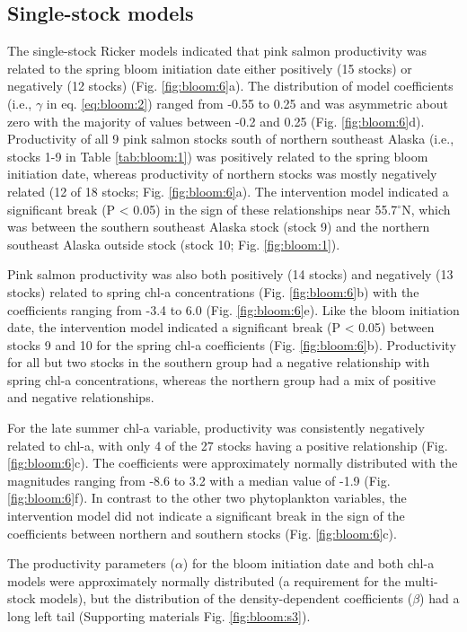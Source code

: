 \subsection{Single-stock models}

The single-stock Ricker models indicated that pink salmon productivity was
related to the spring bloom initiation date either positively (15 stocks) or
negatively (12 stocks) (Fig. \ref{fig:bloom:6}a). The distribution of model coefficients (i.e.,
\(\gamma\) in eq. \ref{eq:bloom:2}) ranged from -0.55 to 0.25 and was asymmetric
about zero with the majority of values between -0.2 and 0.25 (Fig.
\ref{fig:bloom:6}d).
Productivity of all 9 pink salmon stocks south of northern southeast Alaska
(i.e., stocks 1-9 in Table \ref{tab:bloom:1}) was positively related to the spring bloom
initiation date, whereas productivity of northern stocks was mostly negatively
related (12 of 18 stocks; Fig.  \ref{fig:bloom:6}a). The intervention model indicated a
significant break (P \textless{} 0.05) in the sign of these relationships near
55.7$^{\circ}$N, which was between the southern southeast Alaska stock (stock 9)
and the northern southeast Alaska outside stock (stock 10; Fig.
\ref{fig:bloom:1}).

Pink salmon productivity was also both positively (14 stocks) and negatively (13
stocks) related to spring chl-a concentrations (Fig. \ref{fig:bloom:6}b) with the coefficients
ranging from -3.4 to 6.0 (Fig. \ref{fig:bloom:6}e). Like the bloom initiation date, the
intervention model indicated a significant break (P \textless{} 0.05) between
stocks 9 and 10 for the spring chl-a coefficients (Fig. \ref{fig:bloom:6}b). Productivity for
all but two stocks in the southern group had a negative relationship with spring
chl-a concentrations, whereas the northern group had a mix of positive and
negative relationships.

For the late summer chl-a variable, productivity was consistently negatively
related to chl-a, with only 4 of the 27 stocks having a positive relationship
(Fig. \ref{fig:bloom:6}c). The coefficients were approximately normally distributed with the
magnitudes ranging from -8.6 to 3.2 with a median value of -1.9 (Fig.
\ref{fig:bloom:6}f). In
contrast to the other two phytoplankton variables, the intervention model did
not indicate a significant break in the sign of the coefficients between
northern and southern stocks (Fig. \ref{fig:bloom:6}c).

The productivity parameters (\(\alpha\)) for the bloom initiation date and both
chl-a models were approximately normally distributed (a requirement for the
multi-stock models), but the distribution of the density-dependent coefficients
(\(\beta\)) had a long left tail (Supporting materials Fig. \ref{fig:bloom:s3}).

